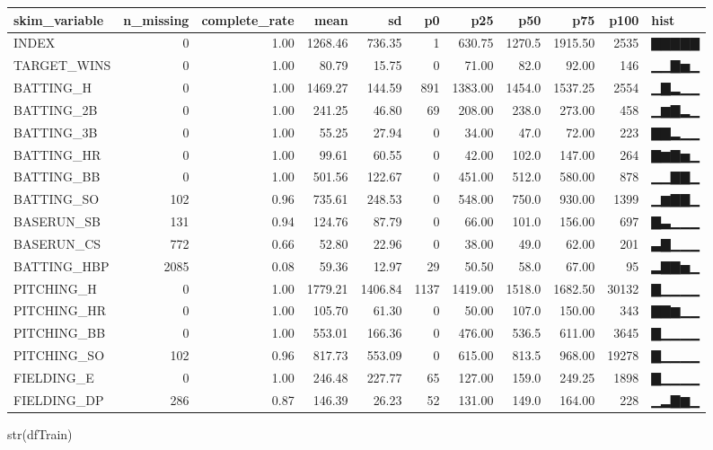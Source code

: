 \documentclass[
]{article}
\newenvironment{Shaded}{\begin{snugshade}}{\end{snugshade}}
\newcommand{\FunctionTok}[1]{\textcolor[rgb]{0.00,0.00,0.00}{#1}}
\newcommand{\NormalTok}[1]{#1}
\begin{document}
\begin{longtable}[]{@{}lrrrrrrrrrl@{}}
\toprule
skim\_variable & n\_missing & complete\_rate & mean & sd & p0 & p25 &
p50 & p75 & p100 & hist \\
\midrule
\endhead
INDEX & 0 & 1.00 & 1268.46 & 736.35 & 1 & 630.75 & 1270.5 & 1915.50 &
2535 & ▇▇▇▇▇ \\
TARGET\_WINS & 0 & 1.00 & 80.79 & 15.75 & 0 & 71.00 & 82.0 & 92.00 & 146
& ▁▁▇▅▁ \\
BATTING\_H & 0 & 1.00 & 1469.27 & 144.59 & 891 & 1383.00 & 1454.0 &
1537.25 & 2554 & ▁▇▂▁▁ \\
BATTING\_2B & 0 & 1.00 & 241.25 & 46.80 & 69 & 208.00 & 238.0 & 273.00 &
458 & ▁▆▇▂▁ \\
BATTING\_3B & 0 & 1.00 & 55.25 & 27.94 & 0 & 34.00 & 47.0 & 72.00 & 223
& ▇▇▂▁▁ \\
BATTING\_HR & 0 & 1.00 & 99.61 & 60.55 & 0 & 42.00 & 102.0 & 147.00 &
264 & ▇▆▇▅▁ \\
BATTING\_BB & 0 & 1.00 & 501.56 & 122.67 & 0 & 451.00 & 512.0 & 580.00 &
878 & ▁▁▇▇▁ \\
BATTING\_SO & 102 & 0.96 & 735.61 & 248.53 & 0 & 548.00 & 750.0 & 930.00
& 1399 & ▁▆▇▇▁ \\
BASERUN\_SB & 131 & 0.94 & 124.76 & 87.79 & 0 & 66.00 & 101.0 & 156.00 &
697 & ▇▃▁▁▁ \\
BASERUN\_CS & 772 & 0.66 & 52.80 & 22.96 & 0 & 38.00 & 49.0 & 62.00 &
201 & ▃▇▁▁▁ \\
BATTING\_HBP & 2085 & 0.08 & 59.36 & 12.97 & 29 & 50.50 & 58.0 & 67.00 &
95 & ▂▇▇▅▁ \\
PITCHING\_H & 0 & 1.00 & 1779.21 & 1406.84 & 1137 & 1419.00 & 1518.0 &
1682.50 & 30132 & ▇▁▁▁▁ \\
PITCHING\_HR & 0 & 1.00 & 105.70 & 61.30 & 0 & 50.00 & 107.0 & 150.00 &
343 & ▇▇▆▁▁ \\
PITCHING\_BB & 0 & 1.00 & 553.01 & 166.36 & 0 & 476.00 & 536.5 & 611.00
& 3645 & ▇▁▁▁▁ \\
PITCHING\_SO & 102 & 0.96 & 817.73 & 553.09 & 0 & 615.00 & 813.5 &
968.00 & 19278 & ▇▁▁▁▁ \\
FIELDING\_E & 0 & 1.00 & 246.48 & 227.77 & 65 & 127.00 & 159.0 & 249.25
& 1898 & ▇▁▁▁▁ \\
FIELDING\_DP & 286 & 0.87 & 146.39 & 26.23 & 52 & 131.00 & 149.0 &
164.00 & 228 & ▁▂▇▆▁ \\
\bottomrule
\end{longtable}

\begin{Shaded}
\begin{Highlighting}[]
\FunctionTok{str}\NormalTok{(dfTrain)}
\end{Highlighting}
\end{Shaded}
\end{document}
